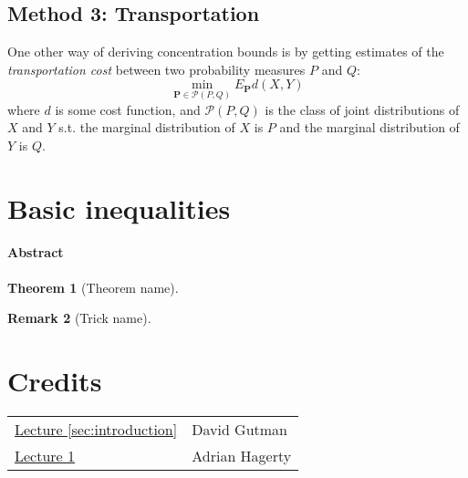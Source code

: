 \documentclass{amsproc}
\newtheorem{theorem}{Theorem}
\newtheorem{remark}[theorem]{Remark}
\newcommand{\fref}[2]{\hyperref[#2]{#1 \ref*{#2}}}
\begin{document}
	\subsection*{Method 3: Transportation}

	One other way of deriving concentration bounds is by getting estimates of the \textit{transportation cost} between two probability measures $P$ and $Q$:
	\[
		\min_{\mathbf{P}\in\mathcal{P}(P,Q)}E_\mathbf{P}d(X,Y)
	\]
	where $d$ is some cost function, and $\mathcal{P}(P,Q)$ is the class of joint distributions of $X$ and $Y$ s.t. the marginal distribution of $X$ is $P$ and the marginal distribution of $Y$ is $Q$.


\section{Basic inequalities}
\label{sec:basic_inequalites}
\paragraph{\textbf{Abstract}}
\lipsum[1]

\begin{theorem}[Theorem name]
\label{thm:reference-name}
\end{theorem}

\begin{remark}[Trick name]
\label{rmk:reference-name}
\end{remark}


\appendix
\newpage
\section*{Credits}
\begin{tabular}{ll}
	\fref{Lecture}{sec:introduction}
	&David Gutman
	\\
	\fref{Lecture}{sec:basic_inequalites}
	&Adrian Hagerty
\end{tabular}



\end{document}
